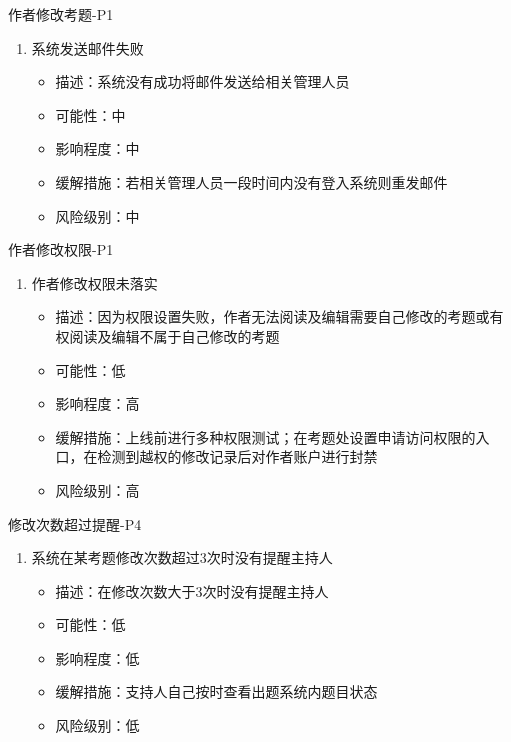 \documentclass[hyperref, a4paper]{ctexart}
\providecommand{\tightlist}{%
  \setlength{\itemsep}{0pt}\setlength{\parskip}{0pt}}
\begin{document}
作者修改考题-P1

\begin{enumerate}
\def\labelenumi{\arabic{enumi}.}
\tightlist
\item
  系统发送邮件失败

  \begin{itemize}
  \tightlist
  \item
    描述：系统没有成功将邮件发送给相关管理人员
  \item
    可能性：中
  \item
    影响程度：中
  \item
    缓解措施：若相关管理人员一段时间内没有登入系统则重发邮件
  \item
    风险级别：中
  \end{itemize}
\end{enumerate}

作者修改权限-P1

\begin{enumerate}
\def\labelenumi{\arabic{enumi}.}
\tightlist
\item
  作者修改权限未落实

  \begin{itemize}
  \tightlist
  \item
    描述：因为权限设置失败，作者无法阅读及编辑需要自己修改的考题或有权阅读及编辑不属于自己修改的考题
  \item
    可能性：低
  \item
    影响程度：高
  \item
    缓解措施：上线前进行多种权限测试；在考题处设置申请访问权限的入口，在检测到越权的修改记录后对作者账户进行封禁
  \item
    风险级别：高
  \end{itemize}
\end{enumerate}

修改次数超过提醒-P4

\begin{enumerate}
\def\labelenumi{\arabic{enumi}.}
\tightlist
\item
  系统在某考题修改次数超过3次时没有提醒主持人

  \begin{itemize}
  \tightlist
  \item
    描述：在修改次数大于3次时没有提醒主持人
  \item
    可能性：低
  \item
    影响程度：低
  \item
    缓解措施：支持人自己按时查看出题系统内题目状态
  \item
    风险级别：低
  \end{itemize}
\end{enumerate}
\end{document}
